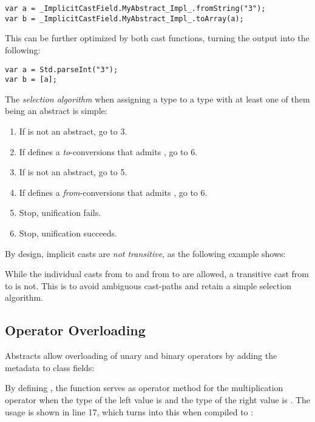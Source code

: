 \begin{lstlisting}
var a = _ImplicitCastField.MyAbstract_Impl_.fromString("3");
var b = _ImplicitCastField.MyAbstract_Impl_.toArray(a);
\end{lstlisting}
This can be further optimized by  both cast functions, turning the output into the following:

\begin{lstlisting}
var a = Std.parseInt("3");
var b = [a];
\end{lstlisting}
The \emph{selection algorithm} when assigning a type  to a type  with at least one of them being an abstract is simple:

\begin{enumerate}
	\item If  is not an abstract, go to 3.
	\item If  defines a \emph{to}-conversions that admits , go to 6.
	\item If  is not an abstract, go to 5.
	\item If  defines a \emph{from}-conversions that admits , go to 6.
	\item Stop, unification fails.
	\item Stop, unification succeeds.
\end{enumerate}



By design, implicit casts are \emph{not transitive}, as the following example shows:

While the individual casts from  to  and from  to  are allowed, a transitive cast from  to  is not. This is to avoid ambiguous cast-paths and retain a simple selection algorithm. 




\subsection{Operator Overloading}
\label{types-abstract-operator-overloading}

Abstracts allow overloading of unary and binary operators by adding the  metadata to class fields:

By defining , the function  serves as operator method for the multiplication \expr{*} operator when the type of the left value is  and the type of the right value is . The usage is shown in line 17, which turns into this when compiled to :

